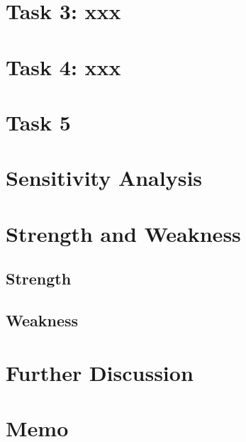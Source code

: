 \documentclass{mcmthesis}
\begin{document}
	
	
	
	
	
	
	
	
	
	
	
	
	
	
	
	
	
	

	
	\section{Task 3: xxx}
	
	
	\section{Task 4: xxx}
	
	\section{Task 5}
	
	\section{Sensitivity Analysis}
	
	\section{Strength and Weakness}
	\subsection{Strength}
	\subsection{Weakness}
	
	\section{Further Discussion}
	
	
	
	\newpage
	\section*{Memo} %
	
\end{document}
